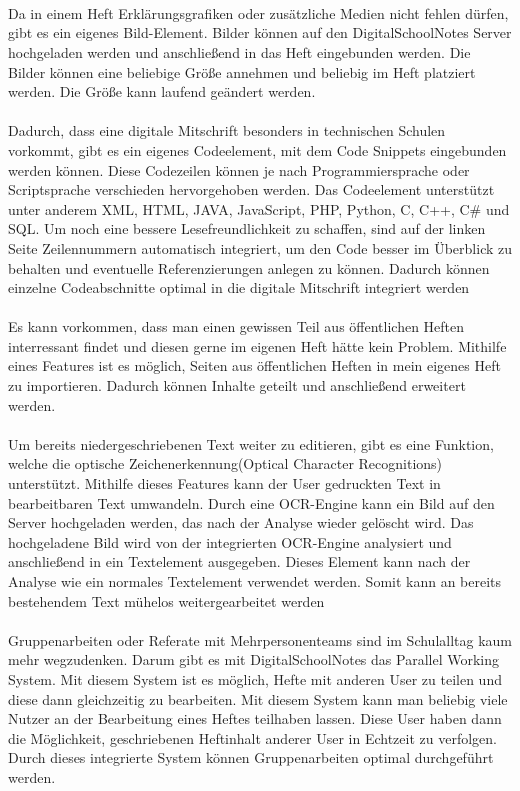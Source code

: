 \\\\\\
Da in einem Heft Erklärungsgrafiken oder zusätzliche Medien nicht fehlen dürfen, gibt es ein eigenes Bild-Element. Bilder können auf den DigitalSchoolNotes Server hochgeladen werden und anschließend in das Heft eingebunden werden. Die Bilder können eine beliebige Größe annehmen und beliebig im Heft platziert werden. Die Größe kann laufend geändert werden.\\
\\
Dadurch, dass eine digitale Mitschrift besonders in technischen Schulen vorkommt, gibt es ein eigenes Codeelement, mit dem Code Snippets eingebunden werden können. Diese Codezeilen können je nach Programmiersprache oder Scriptsprache verschieden hervorgehoben werden. Das Codeelement unterstützt unter anderem XML, HTML, JAVA, JavaScript, PHP, Python, C, C++, C\# und SQL. Um noch eine bessere Lesefreundlichkeit zu schaffen, sind auf der linken Seite Zeilennummern automatisch integriert, um den Code besser im Überblick zu behalten und eventuelle Referenzierungen anlegen zu können. Dadurch können einzelne Codeabschnitte optimal in die digitale Mitschrift integriert werden\\
\\
Es kann vorkommen, dass man einen gewissen Teil aus öffentlichen Heften interressant findet und diesen gerne im eigenen Heft hätte kein Problem. Mithilfe eines Features ist es möglich, Seiten aus öffentlichen Heften in mein eigenes Heft zu importieren. Dadurch können Inhalte geteilt und anschließend erweitert werden. \\
\\
Um bereits niedergeschriebenen Text weiter zu editieren, gibt es eine Funktion, welche die optische Zeichenerkennung(Optical Character Recognitions) unterstützt. Mithilfe dieses Features kann der User gedruckten Text in bearbeitbaren Text umwandeln. Durch eine OCR-Engine kann ein Bild auf den Server hochgeladen werden, das nach der Analyse wieder gelöscht wird. Das hochgeladene Bild wird von der integrierten OCR-Engine analysiert und anschließend in ein Textelement ausgegeben. Dieses Element kann nach der Analyse wie ein normales Textelement verwendet werden. Somit kann an bereits bestehendem Text mühelos weitergearbeitet werden\\
\\
Gruppenarbeiten oder Referate mit Mehrpersonenteams sind im Schulalltag kaum mehr wegzudenken. Darum gibt es mit DigitalSchoolNotes das Parallel Working System. Mit diesem System ist es möglich, Hefte mit anderen User zu teilen und diese dann gleichzeitig zu bearbeiten. Mit diesem System kann man beliebig viele Nutzer an der Bearbeitung eines Heftes teilhaben lassen. Diese User haben dann die Möglichkeit, geschriebenen Heftinhalt anderer User in Echtzeit zu verfolgen. Durch dieses integrierte System können Gruppenarbeiten optimal durchgeführt werden.\\
